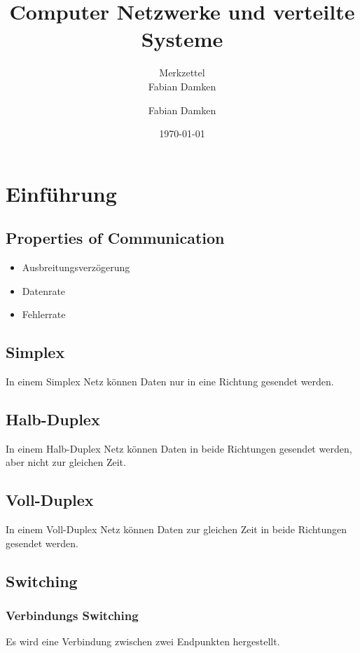 \documentclass[a4paper, 11pt, accentcolor = tud3b]{tudreport}
\title{Computer Netzwerke und verteilte Systeme}
\subtitle{Merkzettel \\ Fabian Damken}
\author{Fabian Damken}
\date{\today}
\begin{document}
    \maketitle
    \tableofcontents
    \listoftodos

    \chapter{Einführung}
        \section{Properties of Communication} %
            \begin{itemize}
            	\item Ausbreitungsverzögerung
            	\item Datenrate
            	\item Fehlerrate
            \end{itemize}

        \section{Simplex}
	        In einem Simplex Netz können Daten nur in eine Richtung gesendet werden.

        \section{Halb-Duplex}
	        In einem Halb-Duplex Netz können Daten in beide Richtungen gesendet werden, aber nicht zur gleichen Zeit.

        \section{Voll-Duplex}
            In einem Voll-Duplex Netz können Daten zur gleichen Zeit in beide Richtungen gesendet werden.

        \section{Switching}
            \subsection{Verbindungs Switching}
                Es wird eine Verbindung zwischen zwei Endpunkten hergestellt.
\end{document}
